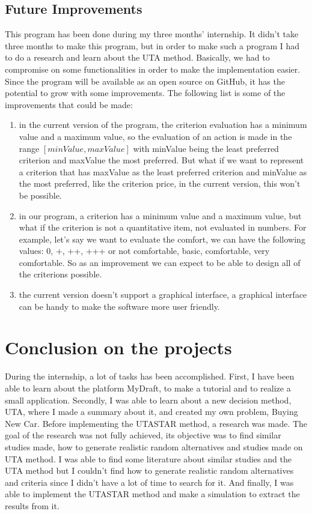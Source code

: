 \documentclass{report}
\begin{document}
\subsection{Future Improvements}
This program has been done during my three months’ internship. It didn't take three months to make this program, but in order to make such a program I had to do a research and learn about the UTA method. Basically, we had to compromise on some functionalities in order to make the implementation easier. Since the program will be available as an open source on GitHub, it has the potential to grow with some improvements. The following list is some of the improvements that could be made:\\
\begin{enumerate}
\item in the current version of the program, the criterion evaluation has a minimum value and a maximum value, so the evaluation of an action is made in the range $[minValue, maxValue]$ with minValue being the least preferred criterion and maxValue the most preferred. But what if we want to represent a criterion that has maxValue as the least preferred criterion and minValue as the most preferred, like the criterion price, in the current version, this won't be possible. 
\item in our program, a criterion has a minimum value and a maximum value, but what if the criterion is not a quantitative item, not evaluated in numbers. For example, let's say we want to evaluate the comfort, we can have the following values: 0, +, ++, +++ or not comfortable, basic, comfortable, very comfortable. So as an improvement we can expect to be able to design all of the criterions possible. 
\item the current version doesn't support a graphical interface, a graphical interface can be handy to make the software more user friendly. 
\end{enumerate}

\section{Conclusion on the projects}
During the internship, a lot of tasks has been accomplished. First, I have been able to learn about the platform MyDraft, to make a tutorial and to realize a small application. Secondly, I was able to learn about a new decision method, UTA, where I made a summary about it, and created my own problem, Buying New Car. Before implementing the UTASTAR method, a research was made. The goal of the research was not fully achieved, its objective was to find similar studies made, how to generate realistic random alternatives and studies made on UTA method. I was able to find some literature about similar studies and the UTA method but I couldn't find how to generate realistic random alternatives and criteria since I didn't have a lot of time to search for it. And finally, I was able to implement the UTASTAR method and make a simulation to extract the results from it. \\
\end{document}
